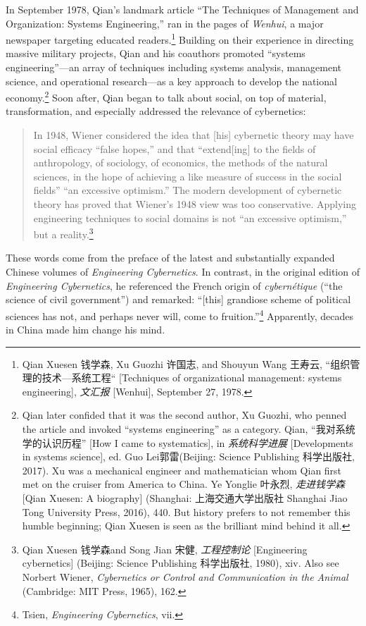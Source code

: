 \documentclass{tufte-handout}
\begin{document}
\begin{CJK*}{UTF8}{gbsn}
In September 1978, Qian's landmark article ``The Techniques of
Management and Organization: Systems Engineering,'' ran in the pages of
\emph{Wenhui}, a major newspaper targeting educated readers.\footnote{Qian
  Xuesen 钱学森, Xu Guozhi 许国志, and Shouyun Wang 王寿云,
  ``组织管理的技术---系统工程`` {[}Techniques of organizational
  management: systems engineering{]}, \emph{文汇报} {[}Wenhui{]},
  September 27, 1978.} Building on their experience in directing massive
military projects, Qian and his coauthors promoted ``systems
engineering''---an array of techniques including systems analysis,
management science, and operational research---as a key approach to
develop the national economy.\footnote{Qian later confided that it was
  the second author, Xu Guozhi, who penned the article and invoked
  ``systems engineering'' as a category. Qian, ``我对系统学的认识历程''
  {[}How I came to systematics{]}, in \emph{系统科学进展}
  {[}Developments in systems science{]}, ed. Guo Lei郭雷(Beijing:
  Science Publishing 科学出版社, 2017). Xu was a mechanical engineer and
  mathematician whom Qian first met on the cruiser from America to
  China. Ye Yonglie 叶永烈, \emph{走进钱学森} {[}Qian Xuesen: A
  biography{]} (Shanghai: 上海交通大学出版社 Shanghai Jiao Tong
  University Press, 2016), 440. But history prefers to not remember this
  humble beginning; Qian Xuesen is seen as the brilliant mind behind it
  all.} Soon after, Qian began to talk about social, on top of material,
transformation, and especially addressed the relevance of cybernetics:

\begin{quote}
In 1948, Wiener considered the idea that {[}his{]} cybernetic theory may
have social efficacy ``false hopes,'' and that ``extend{[}ing{]} to the
fields of anthropology, of sociology, of economics, the methods of the
natural sciences, in the hope of achieving a like measure of success in
the social fields'' ``an excessive optimism.'' The modern development of
cybernetic theory has proved that Wiener's 1948 view was too
conservative. Applying engineering techniques to social domains is not
``an excessive optimism,'' but a reality.\footnote{Qian Xuesen 钱学森and
  Song Jian 宋健, \emph{工程控制论} {[}Engineering cybernetics{]}
  (Beijing: Science Publishing 科学出版社, 1980), xiv. Also see Norbert
  Wiener, \emph{Cybernetics or Control and Communication in the Animal}
  (Cambridge: MIT Press, 1965), 162.}
\end{quote}

\noindent These words come from the preface of the latest and substantially
expanded Chinese volumes of \emph{Engineering Cybernetics}. In contrast,
in the original edition of \emph{Engineering Cybernetics}, he referenced
the French origin of \emph{cybernétique} (``the science of civil
government'') and remarked: ``{[}this{]} grandiose scheme of political
sciences has not, and perhaps never will, come to fruition.''\footnote{Tsien,
  \emph{Engineering Cybernetics}, vii.} Apparently, decades in China
made him change his mind.


\end{CJK*}
\end{document}
